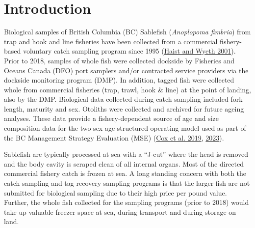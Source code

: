 \documentclass[12pt]{article}\usepackage[]{graphicx}\usepackage[]{color}
\begin{document}

\frontmatter


\renewcommand{\headrulewidth}{0.5pt}  %
\renewcommand{\footrulewidth}{0.5pt}  %

\newcommand{\lt}{\ensuremath <}
\newcommand{\gt}{\ensuremath >}

\newlength{\cslhangindent}
\setlength{\cslhangindent}{1.5em}
\newenvironment{cslreferences}%
  {}%
  {\par}

\hypertarget{introduction}{%
\section{Introduction}\label{introduction}}

Biological samples of British Columbia (BC) Sablefish (\emph{Anoplopoma fimbria}) from trap and hook and line fisheries have been collected from a commercial fishery-based voluntary catch sampling program since 1995 (\protect\hyperlink{ref-Haist2001}{Haist and Wyeth 2001}). Prior to 2018, samples of whole fish were collected dockside by Fisheries and Oceans Canada (DFO) port samplers and/or contracted service providers via the dockside monitoring program (DMP). In addition, tagged fish were collected whole from commercial fisheries (trap, trawl, hook \& line) at the point of landing, also by the DMP. Biological data collected during catch sampling included fork length, maturity and sex. Otoliths were collected and archived for future ageing analyses. These data provide a fishery-dependent source of age and size composition data for the two-sex age structured operating model used as part of the BC Management Strategy Evaluation (MSE) (\protect\hyperlink{ref-Cox2019}{Cox et al. 2019}, \protect\hyperlink{ref-Cox2023}{2023}).

Sablefish are typically processed at sea with a ``J-cut'' where the head is removed and the body cavity is scraped clean of all internal organs. Most of the directed commercial fishery catch is frozen at sea. A long standing concern with both the catch sampling and tag recovery sampling programs is that the larger fish are not submitted for biological sampling due to their high price per pound value. Further, the whole fish collected for the sampling programs (prior to 2018) would take up valuable freezer space at sea, during transport and during storage on land.
\end{document}
